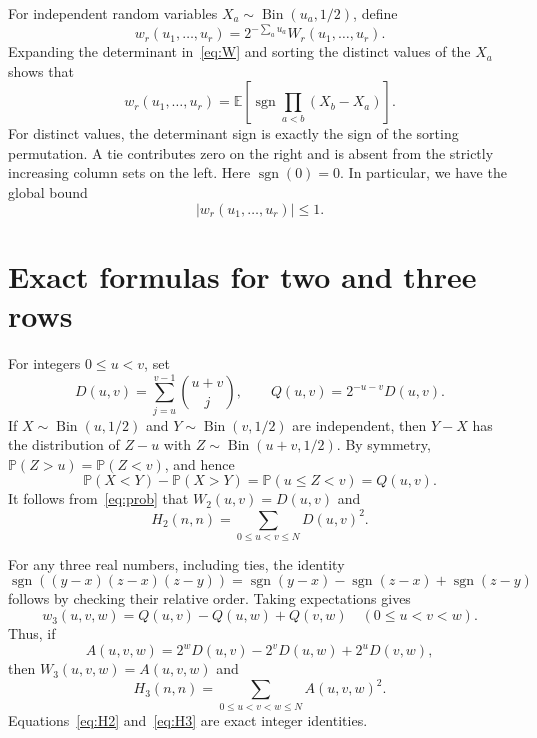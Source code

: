 \documentclass[11pt]{article}
\DeclareMathOperator{\sgn}{sgn}
\newcommand{\E}{\mathbb E}
\newcommand{\Prb}{\mathbb P}
\begin{document}
For independent random variables $X_a\sim\operatorname{Bin}(u_a,1/2)$,
define
\[
 w_r(u_1,\ldots,u_r)=2^{-\sum_a u_a}W_r(u_1,\ldots,u_r).
\]
Expanding the determinant in~\eqref{eq:W} and sorting the distinct
values of the $X_a$ shows that
\begin{equation}\label{eq:prob}
 w_r(u_1,\ldots,u_r)
 =\E\!\left[\sgn\prod_{a<b}(X_b-X_a)\right].
\end{equation}
For distinct values, the determinant sign is exactly the sign of the
sorting permutation. A tie contributes zero on the right and is
absent from the strictly increasing column sets on the left. Here
$\sgn(0)=0$. In particular, we have the global bound
\begin{equation}\label{eq:globalbound}
 |w_r(u_1,\ldots,u_r)|\le1.
\end{equation}

\section{Exact formulas for two and three rows}

For integers $0\le u<v$, set
\begin{equation}\label{eq:D}
 D(u,v)=\sum_{j=u}^{v-1}\binom{u+v}{j},\qquad
 Q(u,v)=2^{-u-v}D(u,v).
\end{equation}
If $X\sim\operatorname{Bin}(u,1/2)$ and
$Y\sim\operatorname{Bin}(v,1/2)$ are independent, then $Y-X$ has
the distribution of $Z-u$ with $Z\sim\operatorname{Bin}(u+v,1/2)$.
By symmetry, $\Prb(Z>u)=\Prb(Z<v)$, and hence
\[
 \Prb(X<Y)-\Prb(X>Y)=\Prb(u\le Z<v)=Q(u,v).
\]
It follows from~\eqref{eq:prob} that $W_2(u,v)=D(u,v)$ and
\begin{equation}\label{eq:H2}
 H_2(n,n)=\sum_{0\le u<v\le N}D(u,v)^2.
\end{equation}

For any three real numbers, including ties, the identity
\begin{equation}\label{eq:sign3}
 \sgn((y-x)(z-x)(z-y))
 =\sgn(y-x)-\sgn(z-x)+\sgn(z-y)
\end{equation}
follows by checking their relative order. Taking expectations gives
\begin{equation}\label{eq:w3}
 w_3(u,v,w)=Q(u,v)-Q(u,w)+Q(v,w)
 \quad(0\le u<v<w).
\end{equation}
Thus, if
\[
 A(u,v,w)=2^wD(u,v)-2^vD(u,w)+2^uD(v,w),
\]
then $W_3(u,v,w)=A(u,v,w)$ and
\begin{equation}\label{eq:H3}
 H_3(n,n)=\sum_{0\le u<v<w\le N}A(u,v,w)^2.
\end{equation}
Equations~\eqref{eq:H2} and~\eqref{eq:H3} are exact integer identities.
\end{document}
